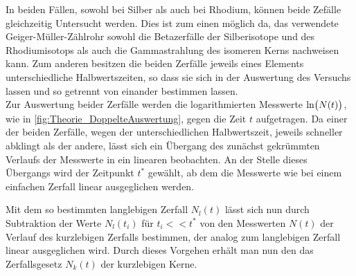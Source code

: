 	In beiden Fällen, sowohl bei Silber als auch bei Rhodium, können beide Zefälle gleichzeitig Untersucht werden.
	Dies ist zum einen möglich da, das verwendete Geiger-Müller-Zählrohr sowohl die  Betazerfälle der Silberisotope
    und des Rhodiumisotops  als auch die Gammastrahlung des isomeren Kerns 
    nachweisen kann. Zum anderen besitzen die beiden Zerfälle jeweils eines Elements unterschiedliche Halbwertszeiten,
    so dass sie sich in der Auswertung des Versuchs  lassen und so getrennt von einander bestimmen lassen.\\   
    
    Zur Auswertung beider Zerfälle werden die logarithmierten Messwerte $\Ln{N(t)}$, wie in
     \cref{fig:Theorie_DoppelteAuswertung}, gegen die Zeit $t$ aufgetragen. 
    Da einer der beiden Zerfälle, wegen der unterschiedlichen Halbwertszeit, jeweils schneller abklingt
    als der andere, lässt sich ein Übergang des zunächst gekrümmten Verlaufs der Messwerte in ein linearen beobachten.
    An der Stelle dieses Übergangs wird der Zeitpunkt $t^{*}$ gewählt, ab dem die Messwerte wie bei einem 
    einfachen Zerfall linear ausgeglichen werden.
    
    Mit dem so bestimmten langlebigen Zerfall $N_{l}(t)$ lässt sich nun durch Subtraktion der Werte $N_{l}(t_{i})$
    für $t_{i} << t^{*}$ von den Messwerten $N(t)$ der Verlauf des kurzlebigen Zerfalls bestimmen, der analog 
 	zum langlebigen Zerfall linear ausgeglichen wird. Durch dieses Vorgehen erhält man nun den das Zerfallsgesetz
 	$N_{k}(t)$ der kurzlebigen Kerne.   
       
